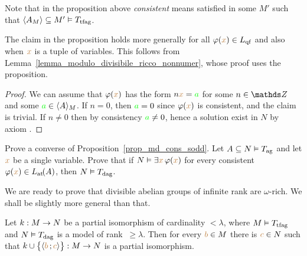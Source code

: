 \documentclass[creche.tex]{subfiles}
\begin{document}
Note that in the proposition above  \textit{consistent\/} means satisfied in some $M'$ such that $\<A_M\>\subseteq M'\models T_{\rm tfag}$.

The claim in the proposition holds more generally for all $\phi({\mr x})\in L_{\rm qf}$ and also when ${\mr x}$ is a tuple of variables. This follows from Lemma~\ref{lemma_modulo_divisibile_ricco_nonnumer}, whose proof uses the proposition.

\begin{proof}
We can assume that $\phi({\mr x})$ has the form $n {\mr x}= {\gr a}$ for some $n\in\ZZ$ and some ${\gr a}\in\<A\>_M$. If $n=0$, then ${\gr a}=0$ since $\phi({\mr x})$ is consistent, and the claim is trivial. If $n\neq0$ then by consistency ${\gr a}\neq0$, hence a solution exist in $N$ by axiom .
\end{proof}

\begin{exercise}
Prove a converse of Proposition~\ref{prop_md_cons_sodd}. Let $A\subseteq N\models T_{\rm ag}$ and let ${\mr x}$ be a single variable. Prove that if $N\models\E{\mr x} \,\phi({\mr x})$ for every consistent $\phi({\mr x})\in\atL(A)$, then $N\models T_{\rm dag}$.\QED
\end{exercise}

We are ready to prove that divisible abelian groups of infinite rank are $\omega$-rich. We shall be slightly more general than that.

\begin{lemma}\label{lemma_modulo_divisibile_ricco_nonnumer}
Let $k:M\imp N$ be a partial isomorphism of cardinality $<\lambda$, where $M\models T_{\rm tfag}$ and $N\models T_{\rm dag}$ is a model of rank $\ \ge\lambda$. Then for every ${\mr b}\in M$ there is ${\mr c}\in N$ such that $k\cup\big\{\<{\mr b}\,;{\mr c}\>\big\}:M\imp N$ is a partial isomorphism.
\end{lemma}
\end{document}

